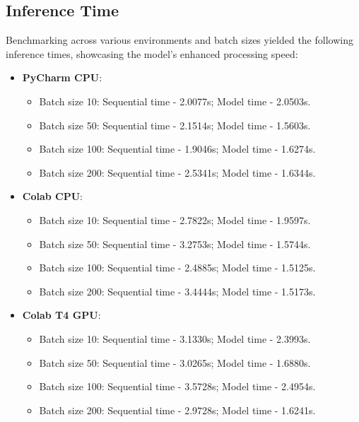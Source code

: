 \documentclass[12pt, a4paper]{article}
\begin{document}
\subsection{Inference Time}
Benchmarking across various environments and batch sizes yielded the following inference times, showcasing the model's enhanced processing speed:

\begin{itemize}
    \item \textbf{PyCharm CPU}:
    \begin{itemize}
        \item Batch size 10: Sequential time - 2.0077s; Model time - 2.0503s.
        \item Batch size 50: Sequential time - 2.1514s; Model time - 1.5603s.
        \item Batch size 100: Sequential time - 1.9046s; Model time - 1.6274s.
        \item Batch size 200: Sequential time - 2.5341s; Model time - 1.6344s.
    \end{itemize}
    
    \item \textbf{Colab CPU}:
    \begin{itemize}
        \item Batch size 10: Sequential time - 2.7822s; Model time - 1.9597s.
        \item Batch size 50: Sequential time - 3.2753s; Model time - 1.5744s.
        \item Batch size 100: Sequential time - 2.4885s; Model time - 1.5125s.
        \item Batch size 200: Sequential time - 3.4444s; Model time - 1.5173s.
    \end{itemize}
    
    \item \textbf{Colab T4 GPU}:
    \begin{itemize}
        \item Batch size 10: Sequential time - 3.1330s; Model time - 2.3993s.
        \item Batch size 50: Sequential time - 3.0265s; Model time - 1.6880s.
        \item Batch size 100: Sequential time - 3.5728s; Model time - 2.4954s.
        \item Batch size 200: Sequential time - 2.9728s; Model time - 1.6241s.
    \end{itemize}
\end{itemize}
\end{document}
